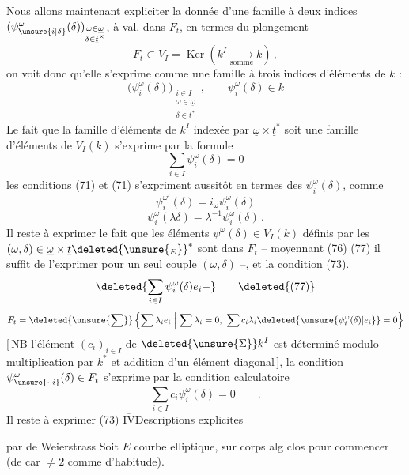 Nous allons maintenant expliciter la donnée d'une famille à deux indices $(\psi_{\unsure{i|\delta}}^\omega(\delta))_{\substack{\omega\in\underline\omega\\\delta\in\underline t^\times}}$, à val. dans $F_t$, en termes du plongement
\[
F_t\subset V_I=\operatorname{Ker}(k^I\xrightarrow[\text{somme}]{}k)\,,
\]
on voit donc qu'elle s'exprime comme une famille à trois indices d'éléments de $k$ :
\[
\bigl(\psi_i^\omega(\delta)\bigr)_{\substack{i\in I\\\omega\in\underline\omega\\\delta\in\underline t^*}}\,,\qquad
\psi_i^\omega(\delta)\in k \tag*{(74)}
\]
Le fait que la famille d'éléments de $k^I$
indexée par $\underline\omega\times\underline t^*$ soit une famille d'éléments de $V_I(k)$ s'exprime par la formule
\[
\sum_{i\in I}\psi_i^\omega(\delta)=0 \tag*{(75)}
\]
les  conditions (71) et (71) s'expriment aussitôt en termes des $\psi_i^\omega(\delta)$, comme
\[
\psi_i^{\omega'}(\delta)=i_\omega\psi_i^\omega(\delta) \tag*{(76)}
\]
\[
\psi_i^\omega(\lambda\delta)=\lambda^{-1}\psi_i^\omega(\delta)\,. \tag*{(77)}
\]
Il reste à exprimer le fait que les éléments $\psi^\omega(\delta)\in V_I(k)$ définis par les $(\omega,\delta)\in\underline\omega\times\underline t\deleted{\unsure{_E}}^*$ sont dans $F_t$ -- moyennant (76) (77) il suffit de l'exprimer pour un seul couple $(\omega,\delta)$ --, et la condition (73). 
\[
\deleted{\sum_{i\in I}\psi_i^\omega(\delta)e_i-}\tag*{\deleted{(77)}}
\]
\[
F_t=\deleted{\unsure{\sum}}\left\{\sum\lambda_ie_i\mathrel{}\middle|\mathrel{}\sum\lambda_i=0,\ 
\sum c_i\lambda_i\deleted{\unsure{\psi_i^\omega(\delta)|e_i}}=0\right\}
\]
[\,\uline{NB} l'élément $(c_i)_{i\in I}$ de $\deleted{\unsure{\Sigma}}k^I$ est déterminé modulo multiplication par $k^*$ et addition d'un élément diagonal\,], la condition $\psi_{\unsure{\cdot|i}}^\omega(\delta)\in F_t$ s'exprime par la condition calculatoire
\[
\sum_{i\in I}c_i\psi_i^\omega(\delta)=0\qquad . \tag*{(78)}
\]
Il reste  à exprimer (73)
\uline{$\overline{\mathrm{IV}}$}\quad Descriptions explicites

par  \inserted{$\wp$} de Weierstrass
Soit $E$ courbe elliptique, sur corps alg clos  pour commencer (de car $\ne2$ comme d'habitude).

